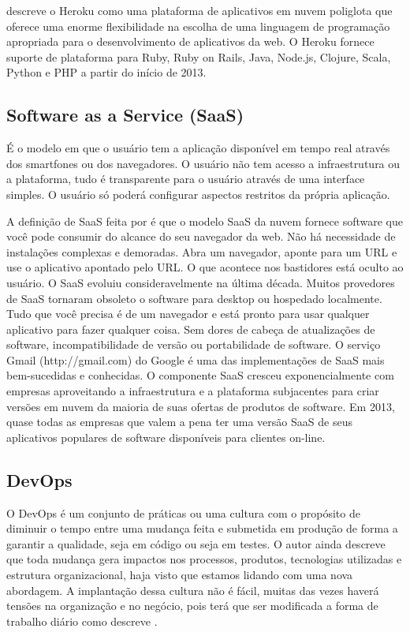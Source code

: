 \cite{Hanjura2014} descreve o Heroku como uma plataforma de aplicativos em nuvem poliglota que oferece uma enorme flexibilidade na escolha de uma linguagem de programação apropriada para o desenvolvimento de aplicativos da web. O Heroku fornece suporte de plataforma para Ruby, Ruby on Rails, Java, Node.js, Clojure, Scala, Python e PHP a partir do início de 2013.

\subsection{Software as a Service (SaaS)}
É o modelo em que o usuário tem a aplicação disponível em tempo real através dos smartfones ou dos navegadores. O usuário não tem acesso a infraestrutura ou a plataforma, tudo é transparente para o usuário através de uma interface simples. O usuário só poderá configurar aspectos restritos da própria aplicação.

A definição de SaaS feita por \cite{Hanjura2014} é que o modelo SaaS da nuvem fornece software que você pode consumir do alcance do seu navegador da web. Não há necessidade de instalações complexas e demoradas. Abra um navegador, aponte para um URL e use o aplicativo apontado pelo URL. O que acontece nos bastidores está oculto ao usuário. O SaaS evoluiu consideravelmente na última década. Muitos provedores de SaaS tornaram obsoleto o software para desktop ou hospedado localmente. Tudo que você precisa é de um navegador e está pronto para usar qualquer aplicativo para fazer qualquer coisa. Sem dores de cabeça de atualizações de software, incompatibilidade de versão ou portabilidade de software. O serviço Gmail (http://gmail.com) do Google é uma das implementações de SaaS mais bem-sucedidas e conhecidas. O componente SaaS cresceu exponencialmente com empresas aproveitando a infraestrutura e a plataforma subjacentes para criar versões em nuvem da maioria de suas ofertas de produtos de software. Em 2013, quase todas as empresas que valem a pena ter uma versão SaaS de seus aplicativos populares de software disponíveis para clientes on-line.


\subsection{DevOps}

O DevOps é um conjunto de práticas ou uma cultura com o propósito de diminuir o tempo entre uma mudança feita e submetida em produção de forma a garantir a qualidade, seja em código ou seja em testes. O autor ainda descreve que toda mudança gera impactos nos processos, produtos, tecnologias utilizadas e estrutura organizacional, haja visto que estamos lidando com uma nova abordagem. A implantação dessa cultura não é fácil, muitas das vezes haverá tensões na organização e no negócio, pois terá que ser modificada a forma de trabalho diário como descreve \cite{Zhu2016}.

